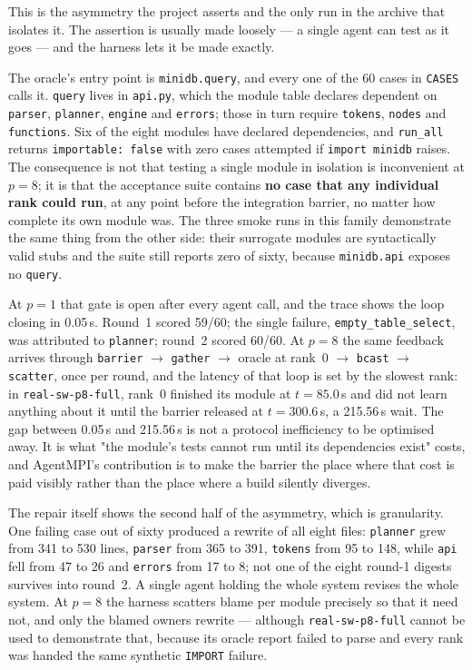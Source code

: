 \documentclass[11pt]{article}
\begin{document}
This is the asymmetry the project asserts and the only run in the archive that isolates it.
The assertion is usually made loosely --- a single agent can test as it goes --- and the
harness lets it be made exactly.

The oracle's entry point is \texttt{minidb.query}, and every one of the 60 cases in
\texttt{CASES} calls it. \texttt{query} lives in \texttt{api.py}, which the module table
declares dependent on \texttt{parser}, \texttt{planner}, \texttt{engine} and \texttt{errors};
those in turn require \texttt{tokens}, \texttt{nodes} and \texttt{functions}. Six of the eight
modules have declared dependencies, and \texttt{run\_all} returns \texttt{importable: false}
with zero cases attempted if \texttt{import minidb} raises. The consequence is not that
testing a single module in isolation is inconvenient at $p=8$; it is that the acceptance suite
contains \textbf{no case that any individual rank could run}, at any point before the
integration barrier, no matter how complete its own module was. The three smoke runs in this
family demonstrate the same thing from the other side: their surrogate modules are
syntactically valid stubs and the suite still reports zero of sixty, because
\texttt{minidb.api} exposes no \texttt{query}.

At $p=1$ that gate is open after every agent call, and the trace shows the loop closing in
0.05\,s. Round~1 scored 59/60; the single failure, \texttt{empty\_table\_select}, was
attributed to \texttt{planner}; round~2 scored 60/60. At $p=8$ the same feedback arrives
through \texttt{barrier} $\rightarrow$ \texttt{gather} $\rightarrow$ oracle at rank~0
$\rightarrow$ \texttt{bcast} $\rightarrow$ \texttt{scatter}, once per round, and the latency of
that loop is set by the slowest rank: in \texttt{real-sw-p8-full}, rank~0 finished its module
at $t=85.0$\,s and did not learn anything about it until the barrier released at $t=300.6$\,s,
a 215.56\,s wait. The gap between 0.05\,s and 215.56\,s is not a protocol inefficiency to be
optimised away. It is what "the module's tests cannot run until its dependencies exist" costs,
and AgentMPI's contribution is to make the barrier the place where that cost is paid visibly
rather than the place where a build silently diverges.

The repair itself shows the second half of the asymmetry, which is granularity. One failing
case out of sixty produced a rewrite of all eight files: \texttt{planner} grew from 341 to 530
lines, \texttt{parser} from 365 to 391, \texttt{tokens} from 95 to 148, while \texttt{api} fell
from 47 to 26 and \texttt{errors} from 17 to 8; not one of the eight round-1 digests survives
into round~2. A single agent holding the whole system revises the whole system. At $p=8$ the
harness scatters blame per module precisely so that it need not, and only the blamed owners
rewrite --- although \texttt{real-sw-p8-full} cannot be used to demonstrate that, because its
oracle report failed to parse and every rank was handed the same synthetic \texttt{IMPORT}
failure.
\end{document}
